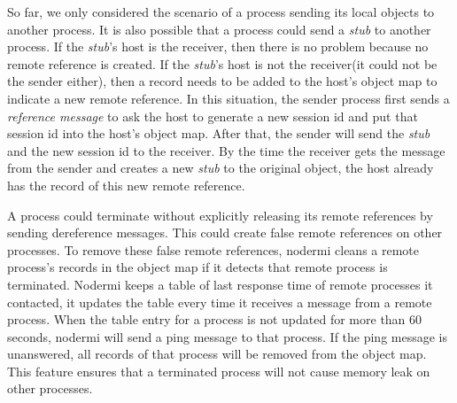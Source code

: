 So far, we only considered the scenario of a process sending its local
objects to another process.
It is also possible that a process could send a \emph{stub} to another process.
If the \emph{stub}'s host is the receiver, then there is no problem because no remote
reference is created.
If the \emph{stub}'s host is not the receiver(it could not be the sender either),
then a record needs to be added to the host's object map to indicate
a new remote reference.
In this situation,
the sender process first sends a \emph{reference message} to
ask the host
to generate a new session id
and put that session id into the host's object map.
After that,
the sender will send the \emph{stub} and the new session id
to the receiver.
By the time the receiver gets the message from the sender
and
creates a new \emph{stub} to the original object,
the host already has the record of this new remote reference.

A process could terminate without explicitly releasing its remote references
by sending dereference messages.
This could create false remote references on other processes.
To remove these false remote references,
nodermi cleans a remote process's records in the object map if
it detects that remote process is terminated.
Nodermi keeps a table of last response time of remote processes it contacted,
it updates the table every time it receives a message from a remote process.
When the table entry for a process is not updated for more than 60 seconds, nodermi
will send a ping message to that process.
If the ping message is unanswered, all records of that process will be removed
from the object map.
This feature ensures that a terminated process will not cause memory leak on
other processes.







